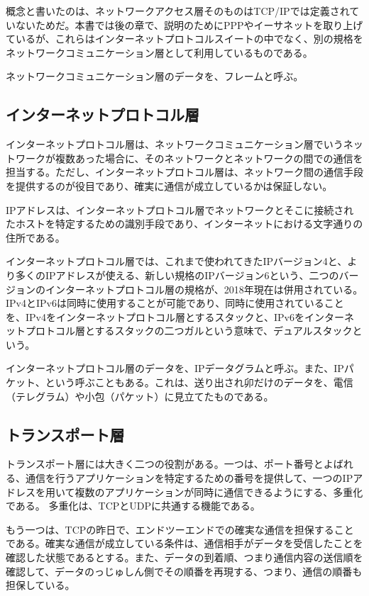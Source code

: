 概念と書いたのは、ネットワークアクセス層そのものはTCP/IPでは定義されていないためだ。本書では後の章で、説明のためにPPPやイーサネットを取り上げているが、これらはインターネットプロトコルスイートの中でなく、別の規格をネットワークコミュニケーション層として利用しているものである。

ネットワークコミュニケーション層のデータを、フレームと呼ぶ。

\subsection{インターネットプロトコル層}
インターネットプロトコル層は、ネットワークコミュニケーション層でいうネットワークが複数あった場合に、そのネットワークとネットワークの間での通信を担当する。ただし、インターネットプロトコル層は、ネットワーク間の通信手段を提供するのが役目であり、確実に通信が成立しているかは保証しない。

IPアドレスは、インターネットプロトコル層でネットワークとそこに接続されたホストを特定するための識別手段であり、インターネットにおける文字通りの住所である。

インターネットプロトコル層では、これまで使われてきたIPバージョン4と、より多くのIPアドレスが使える、新しい規格のIPバージョン6という、二つのバージョンのインターネットプロトコル層の規格が、2018年現在は併用されている。IPv4とIPv6は同時に使用することが可能であり、同時に使用されていることを、IPv4をインターネットプロトコル層とするスタックと、IPv6をインターネットプロトコル層とするスタックの二つガルという意味で、デュアルスタックという。

インターネットプロトコル層のデータを、IPデータグラムと呼ぶ。また、IPパケット、という呼ぶこともある。これは、送り出され卯だけのデータを、電信（テレグラム）や小包（パケット）に見立てたものである。

\subsection{トランスポート層}
トランスポート層には大きく二つの役割がある。一つは、ポート番号とよばれる、通信を行うアプリケーションを特定するための番号を提供して、一つのIPアドレスを用いて複数のアプリケーションが同時に通信できるようにする、多重化である。
多重化は、TCPとUDPに共通する機能である。

もう一つは、TCPの昨日で、エンドツーエンドでの確実な通信を担保することである。確実な通信が成立している条件は、通信相手がデータを受信したことを確認した状態であるとする。また、データの到着順、つまり通信内容の送信順を確認して、データのっじゅしん側でその順番を再現する、つまり、通信の順番も担保している。

